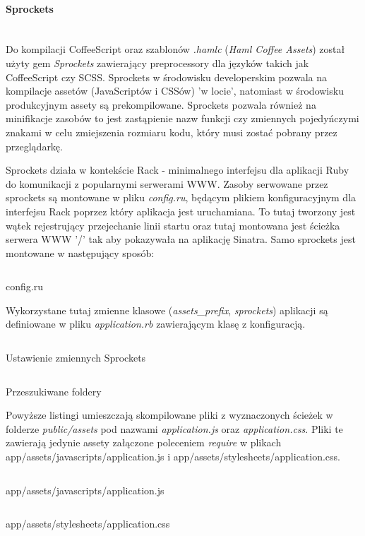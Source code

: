 \documentclass[11pt,a4paper, twoside]{article}
\begin{document}
\paragraph{Sprockets} ~\\
\newline
Do kompilacji CoffeeScript oraz szablonów \emph{.hamlc} (\emph{Haml Coffee Assets}) został użyty gem \emph{Sprockets} zawierający preprocessory dla języków takich jak CoffeeScript czy SCSS. Sprockets w środowisku developerskim pozwala na kompilacje assetów (JavaScriptów i CSSów) 'w locie', natomiast w środowisku produkcyjnym assety są prekompilowane. Sprockets pozwala również na minifikacje zasobów to jest zastąpienie nazw funkcji czy zmiennych pojedyńczymi znakami w celu zmiejszenia rozmiaru kodu, który musi zostać pobrany przez przeglądarkę. 

Sprockets działa w kontekście Rack - minimalnego interfejsu dla aplikacji Ruby do komunikacji z popularnymi serwerami WWW. Zasoby serwowane przez sprockets są montowane w pliku \emph{config.ru}, będącym plikiem konfiguracyjnym dla interfejsu Rack poprzez który aplikacja jest uruchamiana. To tutaj tworzony jest wątek rejestrujący przejechanie linii startu oraz tutaj montowana jest ścieżka serwera WWW '/' tak aby pokazywała na aplikację Sinatra. 
\noindent
Samo sprockets jest montowane w następujący sposób:
\begin{listing}[H]
\inputminted[linenos=true]{ruby}{./src/sprockets_mount.rb}
\caption{config.ru}
\end{listing}
\noindent
Wykorzystane tutaj zmienne klasowe (\emph{assets\_prefix}, \emph{sprockets}) aplikacji są definiowane w pliku \emph{application.rb} zawierającym klasę z konfiguracją.
\begin{listing}[H]
\inputminted[linenos=true]{ruby}{./src/sprockets_config.rb}
\caption{Ustawienie zmiennych Sprockets}
\end{listing}
\noindent
\begin{listing}[H]
\inputminted[linenos=true]{ruby}{./src/sprockets_asset_paths.rb}
\caption{Przeszukiwane foldery}
\end{listing}
\noindent
Powyższe listingi umieszczają skompilowane pliki z wyznaczonych ścieżek w folderze \emph{public/assets} pod nazwami \emph{application.js} oraz \emph{application.css}. Pliki te zawierają jedynie assety załączone poleceniem \emph{require} w plikach app/assets/javascripts/application.js i app/assets/stylesheets/application.css.
\begin{listing}[H]
\inputminted[linenos=true]{javascript}{./src/application.js}
\caption{app/assets/javascripts/application.js}
\end{listing}
\begin{listing}[H]
\inputminted[linenos=true]{javascript}{./src/application.css}
\caption{app/assets/stylesheets/application.css}
\end{listing}
\end{document}
